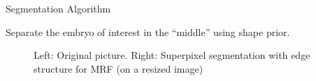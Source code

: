 \documentclass[mathserif,final,hyperref={pdfpagelabels=false}]{beamer} %
\begin{document}
\begin{frame}
\begin{columns}
\begin{column2lti}
\begin{blockredlti}{Segmentation Algorithm}
\end{blockredlti}

\vfill


\begin{examplelti}


Separate the embryo of interest in the ``middle'' using shape prior.

 \begin{figure}[htbp]
  \centering
\caption{Left: Original picture. Right: Superpixel segmentation with edge structure for MRF (on a resized image)}
\label{Superpixels}
 \end{figure}


\end{examplelti}
\end{column2lti}
\end{columns}
\end{frame}
\end{document}
